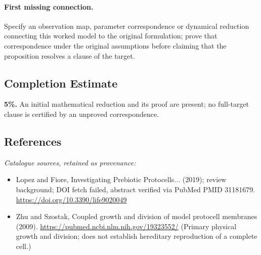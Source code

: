 \documentclass[11pt]{article}
\begin{document}
\paragraph{First missing connection.} Specify an observation map, parameter correspondence or dynamical reduction connecting this worked model to the original formulation; prove that correspondence under the original assumptions before claiming that the proposition resolves a clause of the target.
\subsection{Completion Estimate}
\textbf{5\%.} An initial mathematical reduction and its proof are present; no full-target clause is certified by an unproved correspondence.
\subsection{References}
\noindent\emph{Catalogue sources, retained as provenance:}
\begin{itemize}
\item Lopez and Fiore, Investigating Prebiotic Protocells... (2019); review background; DOI fetch failed, abstract verified via PubMed PMID 31181679. \url{https://doi.org/10.3390/life9020049}
\item Zhu and Szostak, Coupled growth and division of model protocell membranes (2009). \url{https://pubmed.ncbi.nlm.nih.gov/19323552/} (Primary physical growth and division; does not establish hereditary reproduction of a complete cell.)
\end{itemize}
\end{document}
